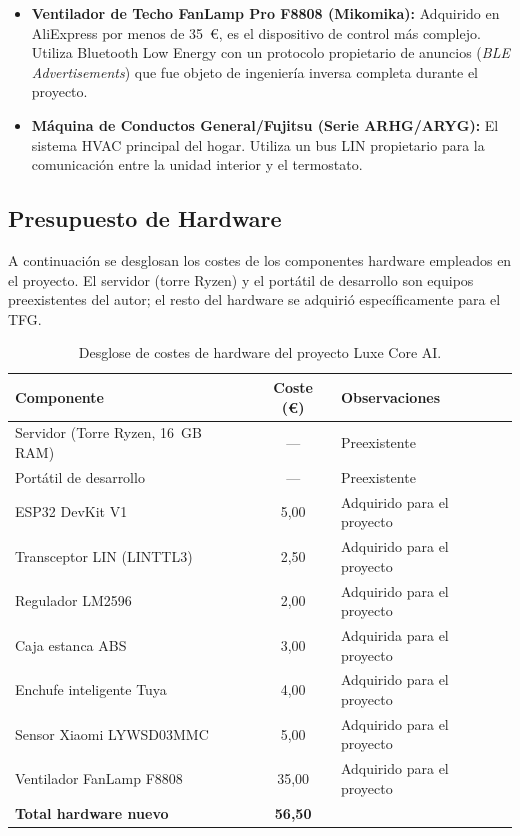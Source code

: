 \begin{itemize}
    \item \textbf{Ventilador de Techo FanLamp Pro F8808 (Mikomika):} Adquirido en AliExpress por menos de 35~\euro{}, es el dispositivo de control más complejo. Utiliza Bluetooth Low Energy con un protocolo propietario de anuncios (\textit{BLE Advertisements}) que fue objeto de ingeniería inversa completa durante el proyecto.

    \item \textbf{Máquina de Conductos General/Fujitsu (Serie ARHG/ARYG):} El sistema HVAC principal del hogar. Utiliza un bus LIN propietario para la comunicación entre la unidad interior y el termostato.
\end{itemize}

\subsection{Presupuesto de Hardware}

A continuación se desglosan los costes de los componentes hardware empleados en el proyecto. El servidor (torre Ryzen) y el portátil de desarrollo son equipos preexistentes del autor; el resto del hardware se adquirió específicamente para el TFG.

\begin{table}[ht]
\centering
\begin{tabular}{|l|c|l|}
\hline
\textbf{Componente} & \textbf{Coste (\euro{})} & \textbf{Observaciones} \\
\hline
Servidor (Torre Ryzen, 16~GB RAM) & --- & Preexistente \\
Portátil de desarrollo & --- & Preexistente \\
ESP32 DevKit V1 & 5,00 & Adquirido para el proyecto \\
Transceptor LIN (LINTTL3) & 2,50 & Adquirido para el proyecto \\
Regulador LM2596 & 2,00 & Adquirido para el proyecto \\
Caja estanca ABS & 3,00 & Adquirida para el proyecto \\
Enchufe inteligente Tuya & 4,00 & Adquirido para el proyecto \\
Sensor Xiaomi LYWSD03MMC & 5,00 & Adquirido para el proyecto \\
Ventilador FanLamp F8808 & 35,00 & Adquirido para el proyecto \\
\hline
\textbf{Total hardware nuevo} & \textbf{56,50} & \\
\hline
\end{tabular}
\caption{Desglose de costes de hardware del proyecto Luxe Core AI.}

\end{table}

